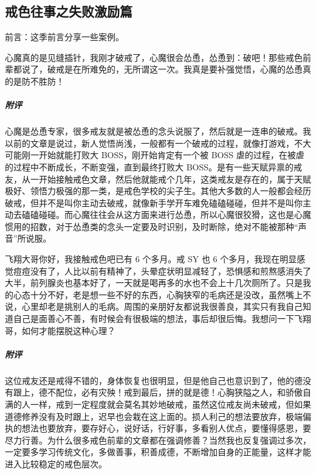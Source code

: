 \subsection{戒色往事之失败激励篇}

前言：这季前言分享一些案例。

\begin{case}
    心魔真的是见缝插针，我刚才破戒了，心魔很会怂恿，怂恿到：破吧！那些戒色前辈都说了，破戒是在所难免的，无所谓这一次。我真是要补强觉悟，心魔的怂恿真的是防不胜防！
    \subparagraph{附评} 心魔是怂恿专家，很多戒友就是被怂恿的念头说服了，然后就是一连串的破戒。我以前的文章是说过，新人觉悟尚浅，一般都有一个破戒的过程，就像打游戏，不大可能刚一开始就能打败大 BOSS，刚开始肯定有一个被 BOSS 虐的过程，在被虐的过程中不断成长，不断变强，直到最终打败大 BOSS。是有一些天赋异禀的戒友，从一开始接触戒色文章，然后他就能戒个几年，这类戒友是存在的，属于天赋极好、领悟力极强的那一类，是戒色学校的尖子生。其他大多数的人一般都会经历破戒，但并不是叫你主动去破戒，就像新手学开车难免磕磕碰碰，但并不是叫你主动去磕磕碰碰。而心魔往往会从这方面来进行怂恿，所以心魔很狡猾，这也是心魔惯用的招数，对于怂恿类的念头一定要及时识别，及时断除，绝对不能被那种“声音”所说服。
\end{case}

\begin{case}
    飞翔大哥你好，我接触戒色吧已有 6 个多月。戒 SY 也 6 个多月，我现在明显感觉痘痘没有了，人比以前有精神了，头晕症状明显减轻了，恐惧感和煎熬感消失了大半，前列腺炎也基本好了，一天就是喝再多的水也不会上十几次厕所了。只是我的心态十分不好，老是想一些不好的东西，心胸狭窄的毛病还是没改，虽然嘴上不说，心里却老是挑别人的毛病。周围的亲朋好友都说我很善良，其实只有我自己知道自己是面善心不善，有时候会有很极端的想法，事后却很后悔。我想问一下飞翔哥，如何才能摆脱这种心理？
    \subparagraph{附评} 这位戒友还是戒得不错的，身体恢复也很明显，但是他自己也意识到了，他的德没有跟上，德不配位，必有灾殃！戒到最后，拼的就是德！心胸狭隘之人，和骄傲自满的人一样，戒到一定程度就会莫名其妙地破戒，虽然这位戒友尚未破戒，但如果道德修养没有及时跟上，迟早也会栽在这上面的。损人利己的想法要放弃，极端偏执的想法也要放弃，要存好心，说好话，行好事，多看别人优点，要懂得感恩，要尽力行善。为什么很多戒色前辈的文章都在强调修善？当然我也反复强调过多次，一定要多学习传统文化，多做善事，积善成德，不断增加自身的正能量，这样才能进入比较稳定的戒色层次。
\end{case}


